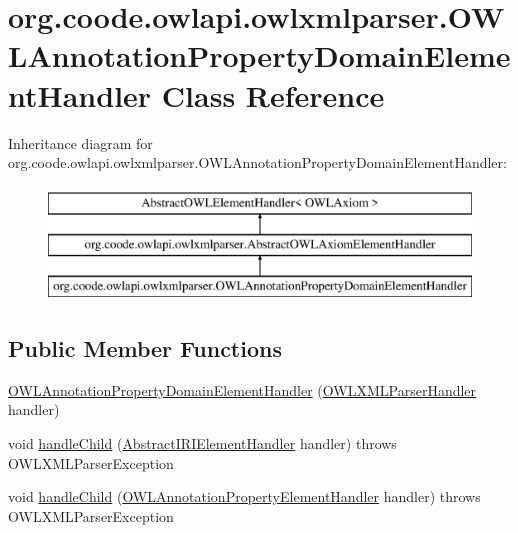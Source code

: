 \hypertarget{classorg_1_1coode_1_1owlapi_1_1owlxmlparser_1_1_o_w_l_annotation_property_domain_element_handler}{\section{org.\-coode.\-owlapi.\-owlxmlparser.\-O\-W\-L\-Annotation\-Property\-Domain\-Element\-Handler Class Reference}
\label{classorg_1_1coode_1_1owlapi_1_1owlxmlparser_1_1_o_w_l_annotation_property_domain_element_handler}
}
Inheritance diagram for org.\-coode.\-owlapi.\-owlxmlparser.\-O\-W\-L\-Annotation\-Property\-Domain\-Element\-Handler\-:\begin{figure}[H]
\begin{center}
\leavevmode
\includegraphics[height=3.000000cm]{classorg_1_1coode_1_1owlapi_1_1owlxmlparser_1_1_o_w_l_annotation_property_domain_element_handler}
\end{center}
\end{figure}
\subsection*{Public Member Functions}
\begin{DoxyCompactItemize}
\item 
\hyperlink{classorg_1_1coode_1_1owlapi_1_1owlxmlparser_1_1_o_w_l_annotation_property_domain_element_handler_aa9b3ac8b10973b1544abf611c915d7c7}{O\-W\-L\-Annotation\-Property\-Domain\-Element\-Handler} (\hyperlink{classorg_1_1coode_1_1owlapi_1_1owlxmlparser_1_1_o_w_l_x_m_l_parser_handler}{O\-W\-L\-X\-M\-L\-Parser\-Handler} handler)
\item 
void \hyperlink{classorg_1_1coode_1_1owlapi_1_1owlxmlparser_1_1_o_w_l_annotation_property_domain_element_handler_a99ff642a8e8855c5fbf5a6e17c10b17f}{handle\-Child} (\hyperlink{classorg_1_1coode_1_1owlapi_1_1owlxmlparser_1_1_abstract_i_r_i_element_handler}{Abstract\-I\-R\-I\-Element\-Handler} handler)  throws O\-W\-L\-X\-M\-L\-Parser\-Exception 
\item 
void \hyperlink{classorg_1_1coode_1_1owlapi_1_1owlxmlparser_1_1_o_w_l_annotation_property_domain_element_handler_a30a14a457e083e9b83e66723d8fe68b3}{handle\-Child} (\hyperlink{classorg_1_1coode_1_1owlapi_1_1owlxmlparser_1_1_o_w_l_annotation_property_element_handler}{O\-W\-L\-Annotation\-Property\-Element\-Handler} handler)  throws O\-W\-L\-X\-M\-L\-Parser\-Exception 
\end{DoxyCompactItemize}

